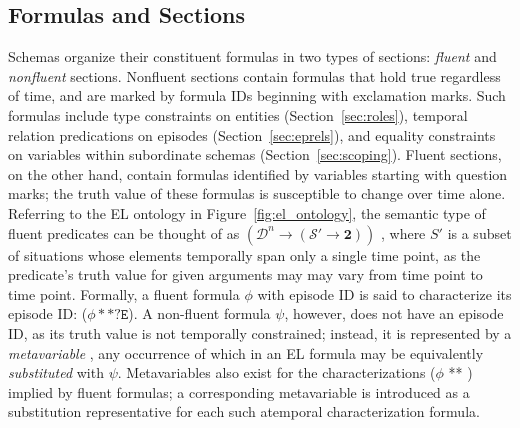 \subsection{Formulas and Sections}
\label{sec:forms_secs}
Schemas organize their constituent formulas in two types of sections: \textit{fluent} and \textit{nonfluent} sections.
Nonfluent sections contain formulas that hold true regardless of time, and are marked by formula IDs beginning with exclamation marks.
Such formulas include type constraints on entities (Section~\ref{sec:roles}), temporal relation predications on episodes (Section~\ref{sec:eprels}), and equality constraints on variables within subordinate schemas (Section~\ref{sec:scoping}).
Fluent sections, on the other hand, contain formulas identified by variables starting with question marks; the truth value of these formulas is susceptible to change over time alone.
Referring to the EL ontology in Figure~\ref{fig:el_ontology}, the semantic type of fluent predicates can be thought of as $(\mathcal{D}^{n} \rightarrow (\mathcal{S'} \rightarrow \textbf{2}))$ , where $S'$ is a subset of situations whose elements temporally span only a single time point, as the predicate's truth value for given arguments may may vary from time point to time point.
Formally, a fluent formula $\phi$ with episode ID  is said to characterize its episode ID: ($\phi ** \texttt{?E}$).
A non-fluent formula $\psi$, however, does not have an episode ID, as its truth value is not temporally constrained; instead, it is represented by a \textit{metavariable} , any occurrence of which in an EL formula may be equivalently \textit{substituted} with $\psi$.
Metavariables also exist for the characterizations ($\phi$ ** ) implied by fluent formulas; a corresponding metavariable  is introduced as a substitution representative for each such atemporal characterization formula.

